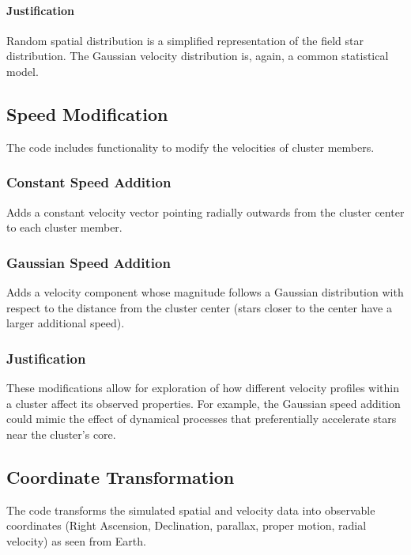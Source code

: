 \documentclass{article}
\begin{document}
	\paragraph{Justification}
	
	Random spatial distribution is a simplified representation of the field star distribution. The Gaussian velocity distribution is, again, a common statistical model.
	
	\subsection{Speed Modification}
	
	The code includes functionality to modify the velocities of cluster members. 
	
	\subsubsection{Constant Speed Addition}
	
	Adds a constant velocity vector pointing radially outwards from the cluster center to each cluster member. 
	
	\subsubsection{Gaussian Speed Addition}
	
	Adds a velocity component whose magnitude follows a Gaussian distribution with respect to the distance from the cluster center (stars closer to the center have a larger additional speed).
	
	\subsubsection{Justification}
	
	These modifications allow for exploration of how different velocity profiles within a cluster affect its observed properties. For example, the Gaussian speed addition could mimic the effect of dynamical processes that preferentially accelerate stars near the cluster's core.
	
	\subsection{Coordinate Transformation}
	
	The code transforms the simulated spatial and velocity data into observable coordinates (Right Ascension, Declination, parallax, proper motion, radial velocity) as seen from Earth. 
	
\end{document}
